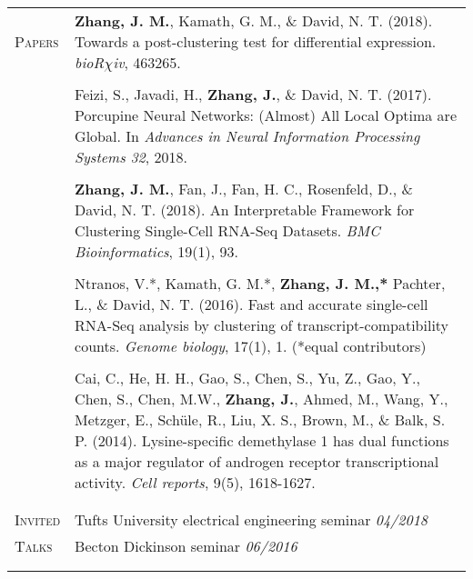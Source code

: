 \documentclass[letterpaper,11pt,oneside]{article}
\begin{document}
\begin{longtable}{@{} p{2.5cm} p{14.8cm}}
 \large{\textsc{Papers}}  & \textbf{Zhang, J. M.}, Kamath, G. M., \& David, N. T. (2018). Towards a post-clustering test for differential expression. \textit{bioR$\chi$iv}, 463265. \\
 	& \\
 
 & Feizi, S., Javadi, H., \textbf{Zhang, J.}, \& David, N. T. (2017). Porcupine Neural Networks: (Almost) All Local Optima are Global. In \textit{Advances in Neural Information Processing Systems 32}, 2018. \\
 	& \\
 
     & \textbf{Zhang, J. M.}, Fan, J., Fan, H. C., Rosenfeld, D., \&  David, N. T. (2018). An Interpretable Framework for Clustering Single-Cell RNA-Seq Datasets. \textit{BMC Bioinformatics}, 19(1), 93. \\
     & \\
     
     & Ntranos, V.*, Kamath, G. M.*, \textbf{Zhang, J. M.,*} Pachter, L., \& David, N. T. (2016). Fast and accurate single-cell RNA-Seq analysis by clustering of transcript-compatibility counts. \textit{Genome biology}, 17(1), 1. (*equal contributors) \\
     & \\
     
     & Cai, C., He, H. H., Gao, S., Chen, S., Yu, Z., Gao, Y., Chen, S., Chen, M.W., \textbf{Zhang, J.}, Ahmed, M., Wang, Y., Metzger, E., Sch\"{u}le, R., Liu, X. S., Brown, M., \& Balk, S. P. (2014). Lysine-specific demethylase 1 has dual functions as a major regulator of androgen receptor transcriptional activity. \textit{Cell reports}, 9(5), 1618-1627. \\
     & \\ 
     & \\
     

 \large{\textsc{Invited}}  & Tufts University electrical engineering seminar  \hfill \textit{04/2018}\\*
 \large{\textsc{Talks}} & Becton Dickinson seminar  \hfill \textit{06/2016} \\
 & \\
 & \\
    


\end{longtable}
\end{document}

